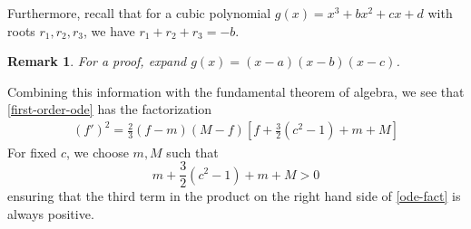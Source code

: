 \documentclass[12pt,reqno]{amsart}
\numberwithin{equation}{section}  %
\newcommand{\ee}{\varepsilon}
\newtheorem{remark}[theorem]{Remark}
\begin{document}
%
%
%
Furthermore, recall that for a cubic polynomial $g(x) = x^{3} +bx^{2} +cx +d$
with roots $r_{1}, r_{2}, r_{3}$, we have $r_{1} + r_{2} + r_{3} = -b$.
%
%
\begin{framed}
%
%
\begin{remark}
\label{rem:fact-pf}
For a proof, expand 
$g(x) = (x-a)(x-b)(x-c)$.
\end{remark}
%
%
\end{framed}
%
%
Combining this information with the fundamental theorem of algebra, 
we see that \eqref{first-order-ode} has the factorization
%
%
%
%
\begin{equation}
\begin{split}
  \left ( f'\right )^{2}
  = \frac{2}{3} \left (f-m\right )
  \left( M-f\right )
  \left [ f + \frac{3}{2}(c^{2} -1) +m +M  \right ]
\end{split}
\label{ode-fact}
\end{equation}
%
For fixed $c$, we choose $m, M$ such that 
\begin{equation}
  \label{max-min-bound}
  m + \frac{3}{2}(c^{2} -1) + m + M > 0 
\end{equation}
%
ensuring that the third term in the product on the right hand side of
\eqref{ode-fact} is always positive.
%
%
%
\end{document}
